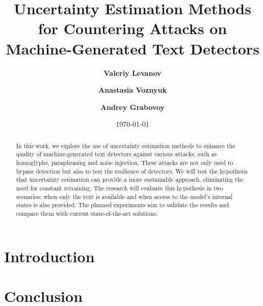 \documentclass[a4paper, 12pt]{article}
\title{Uncertainty Estimation Methods for Countering Attacks on Machine-Generated Text Detectors}
\author[1]{\textbf{Valeriy Levanov}}
\author[1]{\textbf{Anastasia Voznyuk}}
\author[1]{\textbf{Andrey Grabovoy}}
\affil[1]{\texttt{Moscow Institute of Physics and Technology, Moscow}}
\date{\today}
\begin{document}
\maketitle

\begin{abstract}
	In this work, we explore the use of uncertainty estimation methods to enhance the quality of machine-generated text detectors against various attacks, such as homoglyphs, paraphrasing and noise injection. These attacks are not only used to bypass detection but also to test the resilience of detectors. We will test the hypothesis that uncertainty estimation can provide a more sustainable approach, eliminating the need for constant retraining. The research will evaluate this hypothesis in two scenarios: when only the text is available and when access to the model's internal states is also provided. The planned experiments aim to validate the results and compare them with current state-of-the-art solutions.
\end{abstract}

\section{Introduction}



\section{Conclusion}




\end{document}
